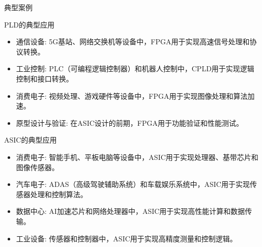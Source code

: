 \documentclass[
  ignorenonframetext,
  chinese,
]{beamer}
\providecommand{\tightlist}{%
  \setlength{\itemsep}{0pt}\setlength{\parskip}{0pt}}
\begin{document}
\begin{frame}
\begin{block}{典型案例}
\label{ux5178ux578bux6848ux4f8b}
\begin{block}{PLD的典型应用}
\label{pldux7684ux5178ux578bux5e94ux7528}
\begin{itemize}
\tightlist
\item
  通信设备:
  5G基站、网络交换机等设备中，FPGA用于实现高速信号处理和协议转换。
\item
  工业控制:
  PLC（可编程逻辑控制器）和机器人控制中，CPLD用于实现逻辑控制和接口转换。
\item
  消费电子: 视频处理、游戏硬件等设备中，FPGA用于实现图像处理和算法加速。
\item
  原型设计与验证: 在ASIC设计的前期，FPGA用于功能验证和性能测试。
\end{itemize}
\end{block}
\end{block}
\end{frame}

\begin{frame}
\begin{block}{ASIC的典型应用}
\label{asicux7684ux5178ux578bux5e94ux7528}
\begin{itemize}
\tightlist
\item
  消费电子:
  智能手机、平板电脑等设备中，ASIC用于实现处理器、基带芯片和图像传感器。
\item
  汽车电子:
  ADAS（高级驾驶辅助系统）和车载娱乐系统中，ASIC用于实现传感器处理和控制算法。
\item
  数据中心: AI加速芯片和网络处理器中，ASIC用于实现高性能计算和数据传输。
\item
  工业设备: 传感器和控制器中，ASIC用于实现高精度测量和控制逻辑。
\end{itemize}
\end{block}
\end{frame}
\end{document}
